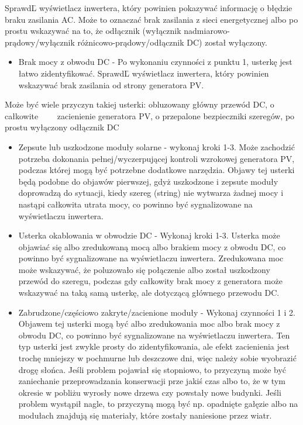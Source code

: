 \documentclass[12pt,a4paper]{article}
\begin{document}
SprawdĽ wyświetlacz inwertera, który powinien pokazywać informację o 
błędzie braku zasilania AC. Może to oznaczać brak zasilania z sieci 
energetycznej albo po prostu wskazywać na to, że odłącznik (wyłącznik 
nadmiarowo-prądowy/wyłącznik różnicowo-prądowy/odłącznik DC) został 
wyłączony. 

\begin{itemize}
\item Brak mocy z obwodu DC - Po wykonaniu czynności z punktu 1, usterkę 
jest łatwo zidentyfikować. SprawdĽ wyświetlacz inwertera, który powinien 
wskazywać brak zasilania od strony generatora PV. 
\end{itemize}
Może być wiele przyczyn takiej usterki: obluzowany główny przewód DC, o 
całkowite \ \ \ \ zacienienie generatora PV, o przepalone bezpieczniki 
szeregów, po prostu wyłączony odłącznik DC 

\begin{itemize}
\item Zepsute lub uszkodzone moduły solarne - wykonaj kroki 1-3. Może 
zachodzić potrzeba dokonania pełnej/wyczerpującej kontroli wzrokowej 
generatora PV, podczas której mogą być potrzebne dodatkowe narzędzia. 
Objawy tej usterki będą podobne do objawów pierwszej, gdyż uszkodzone i 
zepsute moduły doprowadzą do sytuacji, kiedy szereg (string) nie 
wytwarza żadnej mocy i nastąpi całkowita utrata mocy, co powinno być 
sygnalizowane na wyświetlaczu inwertera. 
\item Usterka okablowania w obwodzie DC - Wykonaj kroki 1-3. Usterka 
może objawiać się albo zredukowaną mocą albo brakiem mocy z obwodu DC, 
co powinno być sygnalizowane na wyświetlaczu inwertera. Zredukowana moc 
może wskazywać, że poluzowało się połączenie albo został uszkodzony 
przewód do szeregu, podczas gdy całkowity brak mocy z generatora może 
wskazywać na taką samą usterkę, ale dotyczącą głównego przewodu DC. 
\end{itemize}
 

\begin{itemize}
\item Zabrudzone/częściowo zakryte/zacienione moduły - Wykonaj czynności 
1 i 2. Objawem tej usterki mogą być albo zredukowania moc albo brak mocy 
z obwodu DC, co powinno być sygnalizowane na wyświetlaczu inwertera. Ten 
typ usterki jest zwykle prosty do zidentyfikowania, ale efekt 
zacienienia jest trochę mniejszy w pochmurne lub deszczowe dni, więc 
należy sobie wyobrazić drogę słońca. Jeśli problem pojawiał się 
stopniowo, to przyczyną może być zaniechanie przeprowadzania konserwacji 
prze jakiś czas albo to, że w tym okresie w pobliżu wyrosły nowe drzewa 
czy powstały nowe budynki. Jeśli problem wystąpił nagle, to przyczyną 
mogą być np. opadnięte gałęzie albo na modułach znajdują się materiały, 
które zostały naniesione przez wiatr. 
\end{itemize}
 
\end{document}
